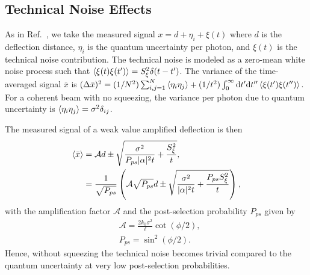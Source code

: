\subsection{Technical Noise Effects}
As in Ref.~\cite{Starling2009}, we take the measured signal $x = d + \eta_i + \xi(t)$ where $d$ is the deflection distance, $\eta_i$ is the quantum uncertainty per photon, and $\xi(t)$ is the technical noise contribution.  The technical noise is modeled as a zero-mean white noise process such that $\left\langle \xi(t)\xi(t') \right\rangle = S_\xi^2\delta(t-t')$.  The variance of the time-averaged signal $\bar{x}$ is $(\Delta \bar{x})^2 = (1/N^2)\sum^N_{i,j=1}\left\langle \eta_i\eta_j \right\rangle + (1/t^2)\int^\infty_0\text{d}t'\text{d}t''\left\langle \xi(t')\xi(t'') \right\rangle$.  For a coherent beam with no squeezing, the variance per photon due to quantum uncertainty is $\left\langle \eta_i\eta_j \right\rangle = \sigma^2\delta_{ij}$.

The measured signal of a weak value amplified deflection is then 
\begin{align}\label{eq:wvsignal}
\nonumber\left\langle \bar{x} \right\rangle &=  \mathcal{A}d \pm \sqrt{\frac{\sigma^2}{P_{ps}|\alpha|^2 t} + \frac{S_\xi^2}{t}},\\
&=\frac{1}{\sqrt{P_{ps}}}\left(\mathcal{A}\sqrt{P_{ps}}d \pm \sqrt{\frac{\sigma^2}{|\alpha|^2 t} + \frac{P_{ps}S_\xi^2}{t}}\right),
\end{align}
with the amplification factor $\mathcal{A}$ and the post-selection probability $P_{ps}$ given by
\begin{align}
&\nonumber \mathcal{A} = \frac{2k_0 \sigma^2}{\ell}\cot (\phi/2),\\
&P_{ps} = \sin^2 (\phi/2).
\end{align}
Hence, without squeezing the technical noise becomes trivial compared to the quantum uncertainty at very low post-selection probabilities.  

